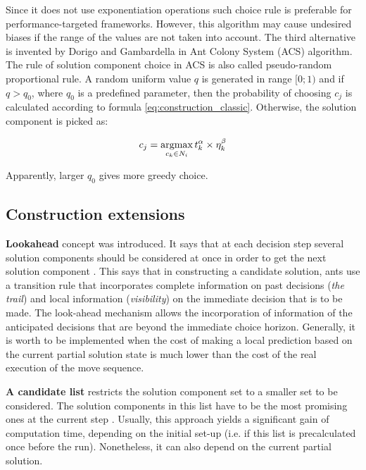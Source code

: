 \documentclass[11pt,a4paper,oneside]{book}
\begin{document}
Since it does not use exponentiation operations such choice rule is preferable for performance-targeted frameworks. However, this algorithm may cause undesired biases if the range of the values are not taken into account. The third alternative is invented by Dorigo and Gambardella \cite{Dorigo1997} in Ant Colony System (ACS) algorithm. The rule of solution component choice in ACS is also called pseudo-random proportional rule. A random uniform value $q$ is generated in range $[0;1)$ and if $q>q_0$, where $q_0$ is a predefined parameter, then the probability of choosing $c_j$ is calculated according to formula \eqref{eq:construction_classic}. Otherwise, the solution component is picked as:

\begin{equation}
c_j = \operatornamewithlimits{argmax}\limits_{c_k \in N_i} t_k^\alpha \times \eta_k^\beta
\label{eq:construction_dorigo}
\end{equation}

Apparently, larger $q_0$ gives more greedy choice.

\subsection{Construction extensions}

\textbf{Lookahead} concept was introduced. It says that at each decision step several solution components should be considered at once in order to get the next solution component \cite{10.1007/BFb0056911}. This says that in constructing a candidate solution, ants use a transition rule that incorporates complete information on past decisions (\emph{the trail}) and local information (\emph{visibility}) on the immediate decision that is to be made. The look-ahead mechanism allows the incorporation of information of the anticipated decisions that are beyond the immediate choice horizon. Generally, it is worth to be implemented when the cost of making a local prediction based on the current partial solution state is much lower than the cost of the real execution of the move sequence.

\textbf{A candidate list} restricts the solution component set to a smaller set to be considered. The solution components in this list have to be the most promising ones at the current step \cite{782657,Dorigo1997}. Usually, this approach yields a significant gain of computation time, depending on the initial set-up (i.e. if this list is precalculated once before the run). Nonetheless, it can also depend on the current partial solution.
\end{document}
